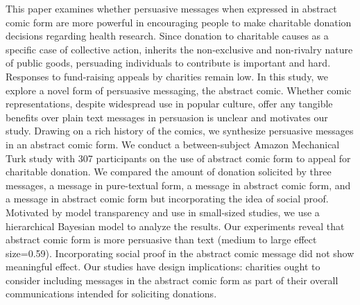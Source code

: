 This paper examines whether persuasive messages when expressed in abstract comic form are more powerful in encouraging people to make charitable donation decisions regarding health research. Since donation to charitable causes as a specific case of collective action, inherits the non-exclusive and non-rivalry nature of public goods, persuading individuals to contribute is important and hard. Responses to fund-raising appeals by charities remain low. In this study, we explore a novel form of persuasive messaging, the abstract comic. Whether comic representations, despite widespread use in popular culture, offer any tangible benefits over plain text messages in persuasion is unclear and motivates our study. Drawing on a rich history of the comics, we synthesize persuasive messages in an abstract comic form. We conduct a between-subject Amazon Mechanical Turk study with 307 participants on the use of abstract comic form to appeal for charitable donation. We compared the amount of donation solicited by three messages, a message in pure-textual form, a message in abstract comic form, and a message in abstract comic form but incorporating the idea of social proof. Motivated by model transparency and use in small-sized studies, we use a hierarchical Bayesian model to analyze the results. Our experiments reveal that abstract comic form is more persuasive than text (medium to large effect size=0.59). Incorporating social proof in the abstract comic message did not show meaningful effect. Our studies have design implications: charities ought to consider including messages in the abstract comic form as part of their overall communications intended for soliciting donations.